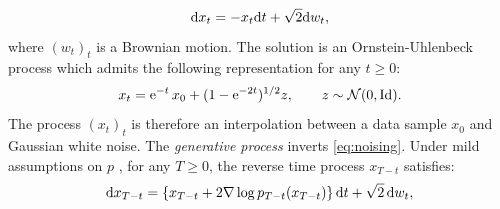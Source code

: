 \documentclass{article}
\begin{document}


\begin{equation}
  \mathrm{d} x_t = -x_t \mathrm{d} t + \sqrt{2} \mathrm{d} w_t, \label{eq:noising}
\end{equation}
where $(w_t)_t$ is a Brownian motion.
The solution is an Ornstein-Uhlenbeck
process which admits the following representation for any $t \geq 0$:
\begin{equation}
  \label{eq:OU_sol}
  x_t = \mathrm{e}^{-t}\, x_0 + (1- \mathrm{e}^{-2t})^{1/2} z , \qquad z \sim {\cal N}(0,\operatorname{Id}) . 
\end{equation}
The process $(x_t)_t$ is therefore an interpolation between a data sample $x_0$ and
Gaussian white noise. The \emph{generative process} inverts
\eqref{eq:noising}. Under mild assumptions on $p$
\citep{cattiaux2021time,haussmann1986time}, for any $T \geq 0$, the reverse time
process $x_{T-t}$ satisfies:
\begin{equation} \label{eq:generative_modeling} 
\mathrm{d} x_{T-t} = \{ x_{T-t} + 2
  \nabla \log p_{T-t}(x_{T-t})\}\, \mathrm{d} t + \sqrt{2} \,\mathrm{d} w_t,
\end{equation}
\end{document}
